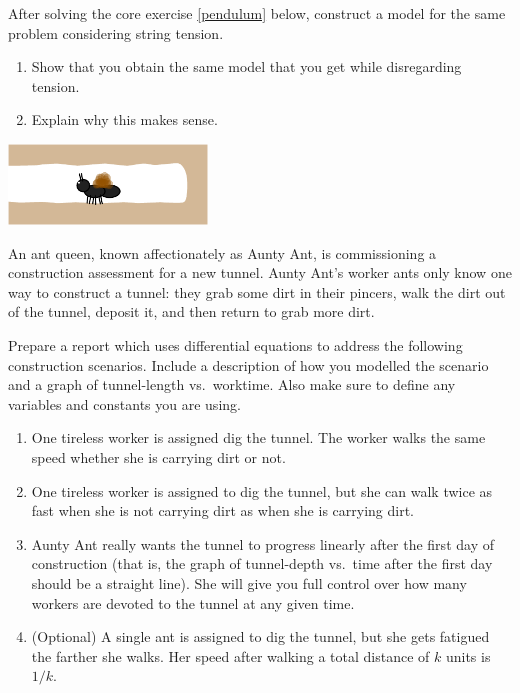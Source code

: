 \begin{exercises}
\begin{problist}
	\prob After solving the core exercise \ref{pendulum} below, construct a model for the same problem considering string tension.
	\begin{enumerate}
		\item Show that you obtain the same model that you get while disregarding tension.
		\item Explain why this makes sense.
	\end{enumerate}
	
	\begin{center}
		\includegraphics*[width=150pt]{images/module11-ant_tunnel.pdf}
	\end{center}
	
	\prob 	An ant queen, known affectionately as Aunty Ant, is commissioning a construction assessment
	for a new tunnel.  Aunty Ant's worker ants only know one way to construct a tunnel: they grab some dirt in their pincers,
	walk the dirt out of the tunnel, deposit it, and then return to grab more dirt.
	
	Prepare a report which uses differential equations to address the following construction scenarios.  Include a
	description of how you modelled the scenario and a graph of tunnel-length vs.~worktime.
	Also make sure to define any variables and constants you are using.

	\begin{enumerate}
		\item One tireless worker is assigned dig the tunnel.  The worker walks the same speed
			whether she is carrying dirt or not.
		\item One tireless worker is assigned to dig the tunnel, but she can walk twice as fast
			when she is not carrying dirt as when she is carrying dirt.
		\item Aunty Ant really wants the tunnel to progress linearly after the first
			day of construction (that is, the graph of tunnel-depth vs.~time after
			the first day should be a straight line).  She will give you full control over
			how many workers are devoted to the tunnel at any given time.
		\item (Optional) A single ant is assigned to dig the tunnel, but she gets fatigued
			the farther she walks.  Her speed after walking a total distance of $k$ units is $1/k$.


\end{enumerate}
\end{problist}
\end{exercises}
